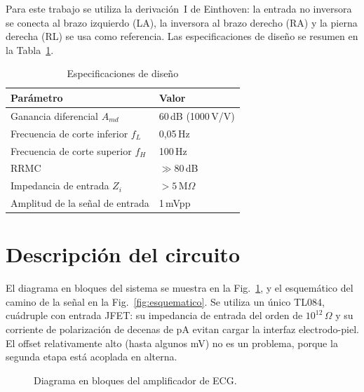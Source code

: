 \documentclass[journal,a4paper]{IEEEtran}
\begin{document}
Para este trabajo se utiliza la derivación~I de Einthoven: la entrada no inversora se conecta al brazo izquierdo (LA), la inversora al brazo derecho (RA) y la pierna derecha (RL) se usa como referencia. Las especificaciones de diseño se resumen en la Tabla~\ref{tab:specs}.

\begin{table}[!h]
\centering
\caption{Especificaciones de diseño}
\label{tab:specs}
\begin{tabular}{@{}ll@{}}
\toprule
Parámetro & Valor \\ \midrule
Ganancia diferencial $A_{md}$ & 60\,dB (1000\,V/V) \\
Frecuencia de corte inferior $f_L$ & 0,05\,Hz \\
Frecuencia de corte superior $f_H$ & 100\,Hz \\
RRMC & $\gg 80$\,dB \\
Impedancia de entrada $Z_i$ & $> 5$\,M$\Omega$ \\
Amplitud de la señal de entrada & 1\,mVpp \\ \bottomrule
\end{tabular}
\end{table}

\section{Descripción del circuito}

El diagrama en bloques del sistema se muestra en la Fig.~\ref{fig:bloques}, y el esquemático del camino de la señal en la Fig.~\ref{fig:esquematico}. Se utiliza un único TL084, cuádruple con entrada JFET: su impedancia de entrada del orden de $10^{12}\,\Omega$ y su corriente de polarización de decenas de pA evitan cargar la interfaz electrodo-piel. El offset relativamente alto (hasta algunos mV) no es un problema, porque la segunda etapa está acoplada en alterna.

\begin{figure}[!t]
\centering
{}
\caption{Diagrama en bloques del amplificador de ECG.}
\label{fig:bloques}
\end{figure}
\end{document}
